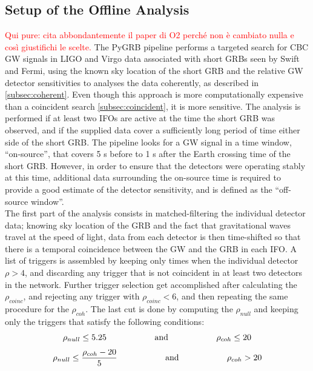 \documentclass[binding=0.6cm, LaM]{sapthesis}
\newcommand{\fpg}[1]{\textcolor{red}{#1} }
\begin{document}
\subsection{Setup of the Offline Analysis}
\label{subsec:pygrb}
\fpg{Qui pure: cita abbondantemente il paper di O2 perch\'e non \`e cambiato nulla e cos\`i giustifichi le scelte.}
	The {\ttfamily PyGRB} pipeline performs a targeted search for CBC GW signals in LIGO and Virgo data associated with short GRBs seen by Swift and Fermi,
        using the known sky location of the short GRB and the relative GW detector sensitivities to analyses the data coherently, as described in \ref{subsec:coherent}.
        Even though this approach is more computationally expensive than a coincident search \ref{subsec:coincident},
        it is more sensitive.
	The analysis is performed if at least two IFOs are active at the time the short GRB was observed, 
	and if the supplied data cover a sufficiently long period of time either side of the short GRB.
	The pipeline looks for a GW signal in a time window, “on-source”, that covers  5 s before to 1 s 
	after the Earth crossing time of the short GRB.
	However, in order to ensure that the detectors were operating stably at this time,
        additional data surrounding the on-source time is required to provide a good estimate of the detector sensitivity,
	and is defined as the “off-source window”. \\
	The first part of the analysis consists in matched-filtering the individual detector data;
	knowing sky location of the GRB and the fact that gravitational waves travel at the speed of light,
	data from each detector is then time-shifted so that there is a temporal coincidence between the GW and the GRB in each IFO.
	A list of triggers is assembled by keeping only times when the individual detector $\rho > 4$,
	and discarding any trigger that is not coincident in at least two detectors in the network. 
	Further trigger selection get accomplished after calculating the $\rho_{coinc}$, 
	and rejecting any trigger with $\rho_{coinc}<6$, and then repeating the same procedure for the $\rho_{coh}$.
	The last cut is done by computing the $\rho_{null}$ and keeping only the triggers that satisfy the following conditions:
		\begin{equation}
			\rho_{null} \leq 5.25 \hspace*{2cm} \text{and} \hspace*{2cm} \rho_{coh} \leq 20
		\end{equation}
		\begin{equation}
			\rho_{null} \leq {{\rho_{coh}-20}\over {5}} \hspace*{2cm} \text{and} \hspace*{2cm} \rho_{coh} > 20
		\end{equation}
\end{document}
